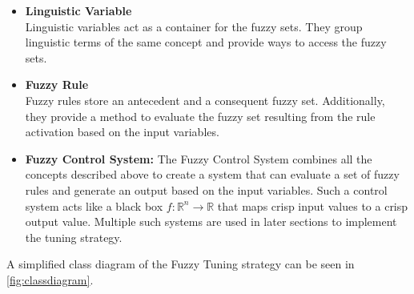 \begin{itemize}
  \item \textbf{Linguistic Variable}\\
        Linguistic variables act as a container for the fuzzy sets. They group linguistic terms of the same concept and provide ways to access the fuzzy sets.

  \item \textbf{Fuzzy Rule}\\
        Fuzzy rules store an antecedent and a consequent fuzzy set. Additionally, they provide a method to evaluate the fuzzy set resulting from the rule activation based on the input variables.

  \item \textbf{Fuzzy Control System:} The Fuzzy Control System combines all the concepts described above to create a system that can evaluate a set of fuzzy rules and generate an output based on the input variables. Such a control system acts like a black box $f: \mathbb{R}^n \rightarrow \mathbb{R}$ that maps crisp input values to a crisp output value. Multiple such systems are used in later sections to implement the tuning strategy.
\end{itemize}

A simplified class diagram of the Fuzzy Tuning strategy can be seen in \autoref{fig:classdiagram}.

\newpage




